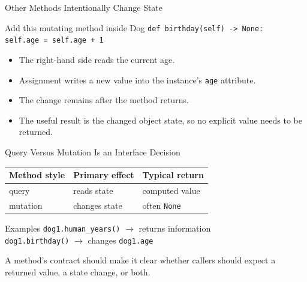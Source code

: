 \documentclass[aspectratio=169,10pt]{beamer}
\begin{document}
\begin{frame}{Other Methods Intentionally Change State}
  \begin{block}{Add this mutating method inside Dog}
    \texttt{def birthday(self) -> None:}\\
    \hspace*{0.20in}\texttt{self.age = self.age + 1}
  \end{block}

  \begin{itemize}
    \item The right-hand side reads the current age.
    \item Assignment writes a new value into the instance's \texttt{age} attribute.
    \item The change remains after the method returns.
    \item The useful result is the changed object state, so no explicit value needs to be returned.
  \end{itemize}
\end{frame}

\begin{frame}{Query Versus Mutation Is an Interface Decision}
  \begin{center}
    \renewcommand{\arraystretch}{1.28}
    \begin{tabular}{l|l|l}
      \textbf{Method style} & \textbf{Primary effect} & \textbf{Typical return} \\\hline
      query & reads state & computed value \\
      mutation & changes state & often \texttt{None}
    \end{tabular}
  \end{center}

  \begin{block}{Examples}
    \texttt{dog1.human\_years()} $\rightarrow$ returns information\\
    \texttt{dog1.birthday()} $\rightarrow$ changes \texttt{dog1.age}
  \end{block}

  \begin{keyidea}
    A method's contract should make it clear whether callers should expect a returned value, a state change, or both.
  \end{keyidea}
\end{frame}
\end{document}
